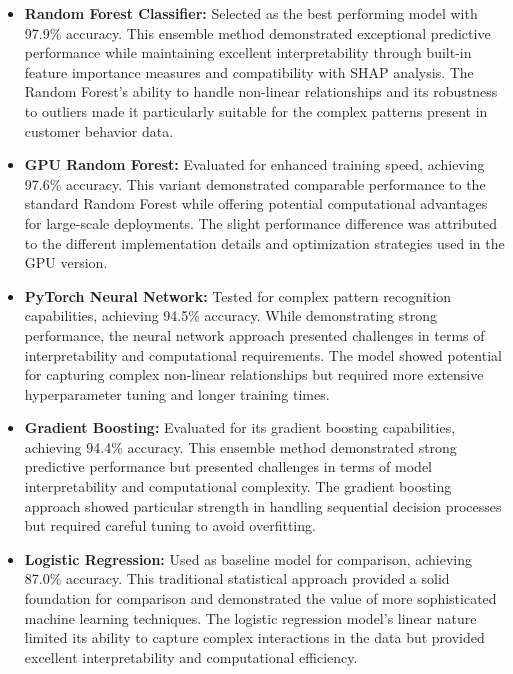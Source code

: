 \documentclass{article}
\begin{document}
\begin{itemize}
    \item \textbf{Random Forest Classifier:} Selected as the best performing model with 97.9\% accuracy. This ensemble method demonstrated exceptional predictive performance while maintaining excellent interpretability through built-in feature importance measures and compatibility with SHAP analysis. The Random Forest's ability to handle non-linear relationships and its robustness to outliers made it particularly suitable for the complex patterns present in customer behavior data.
    
    \item \textbf{GPU Random Forest:} Evaluated for enhanced training speed, achieving 97.6\% accuracy. This variant demonstrated comparable performance to the standard Random Forest while offering potential computational advantages for large-scale deployments. The slight performance difference was attributed to the different implementation details and optimization strategies used in the GPU version.
    
    \item \textbf{PyTorch Neural Network:} Tested for complex pattern recognition capabilities, achieving 94.5\% accuracy. While demonstrating strong performance, the neural network approach presented challenges in terms of interpretability and computational requirements. The model showed potential for capturing complex non-linear relationships but required more extensive hyperparameter tuning and longer training times.
    
    \item \textbf{Gradient Boosting:} Evaluated for its gradient boosting capabilities, achieving 94.4\% accuracy. This ensemble method demonstrated strong predictive performance but presented challenges in terms of model interpretability and computational complexity. The gradient boosting approach showed particular strength in handling sequential decision processes but required careful tuning to avoid overfitting.
    
    \item \textbf{Logistic Regression:} Used as baseline model for comparison, achieving 87.0\% accuracy. This traditional statistical approach provided a solid foundation for comparison and demonstrated the value of more sophisticated machine learning techniques. The logistic regression model's linear nature limited its ability to capture complex interactions in the data but provided excellent interpretability and computational efficiency.
\end{itemize}
\end{document}
